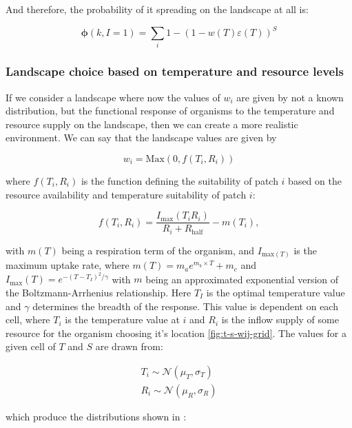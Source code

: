 And therefore, the probability of it spreading on the landscape at all is:

\begin{equation}
    \boldsymbol{\phi}(k, I = 1) = \sum_i 1 - (1 - w(T) \varepsilon(T))^S
\end{equation}

\subsubsection{Landscape choice based on temperature and resource levels}

If we consider a landscape where now the values of $w_{i}$ are given by not a known distribution, but the functional response of organisms to the temperature and resource supply on the landscape, then we can create a more realistic environment. We can say that the landscape values are given by

\begin{equation}
    w_{i} = \text{Max}(0, f(T_{i}, R_{i}))
\end{equation}

where $f(T_{i}, R_{i})$ is the function defining the suitability of patch $i$ based on the resource availability and temperature suitability of patch $i$:

\begin{equation}
    f(T_{i}, R_{i}) = \frac{I_{\text{max}}(T_{i} R_{i})}{R_{i} + R_{\text{half}}} - m(T_{i}),
\end{equation}

with $m(T)$ being a respiration term of the organism, and $I_{\text{max}(T)}$ is the maximum uptake rate, where $m(T) = m_a e^{m_b \times T} + m_c$ and $I_{\text{max}}(T) = e^{-(T - T_I)^2 / \gamma}$ with $m$ being an approximated exponential version of the Boltzmann-Arrhenius relationship. Here $T_I$ is the optimal temperature value and $\gamma$ determines the breadth of the response. This value is dependent on each cell, where $T_{i}$ is the temperature value at $i$ and $R_{i}$ is the inflow supply of some resource for the organism choosing it's location \cref{fig:t-s-wij-grid}. The values for a given cell of $T$ and $S$ are drawn from:

\begin{align} \label{eq:s-t}
    T_{i} \sim \mathcal{N}(\mu_T, \sigma_T) \\
    R_{i} \sim \mathcal{N}(\mu_R, \sigma_R)
\end{align}

which produce the distributions shown in :

